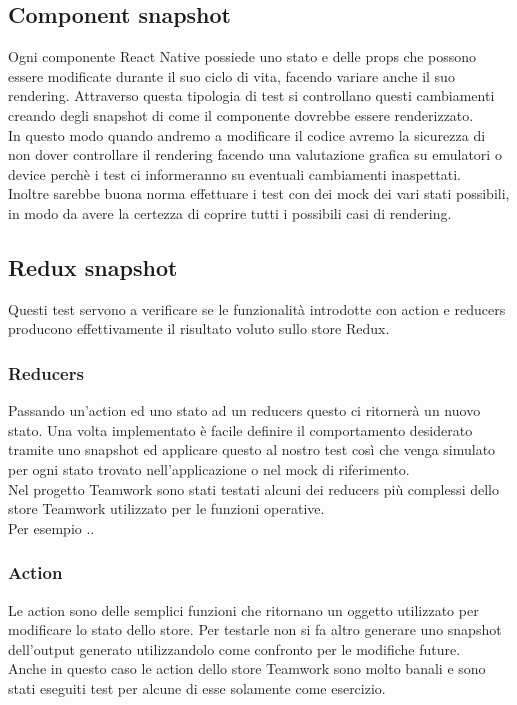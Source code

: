 \subsection{Component snapshot}
Ogni componente React Native possiede uno stato e delle props che possono essere modificate durante il suo ciclo di vita, facendo variare anche il suo rendering. Attraverso questa tipologia di test si controllano questi cambiamenti creando degli snapshot di come il componente dovrebbe essere renderizzato. \\
In questo modo quando andremo a modificare il codice avremo la sicurezza di non dover controllare il rendering facendo una valutazione grafica su emulatori o device perchè i test ci informeranno su eventuali cambiamenti inaspettati. \\
Inoltre sarebbe buona norma effettuare i test con dei mock dei vari stati possibili, in modo da avere la certezza di coprire tutti i possibili casi di rendering.

\subsection{Redux snapshot}
Questi test servono a verificare se le funzionalità introdotte con action e reducers producono effettivamente il risultato voluto sullo store Redux. \\
\subsubsection{Reducers}
Passando un'action ed uno stato ad un reducers questo ci ritornerà un nuovo stato. Una volta implementato è facile definire il comportamento desiderato tramite uno snapshot ed applicare questo al nostro test così che venga simulato per ogni stato trovato nell'applicazione o nel mock di riferimento. \\
Nel progetto Teamwork sono stati testati alcuni dei reducers più complessi dello store Teamwork utilizzato per le funzioni operative.\\
Per esempio ..
\subsubsection{Action}
Le action sono delle semplici funzioni che ritornano un oggetto utilizzato per modificare lo stato dello store. Per testarle non si fa altro generare uno snapshot dell'output generato utilizzandolo come confronto per le modifiche future. \\
Anche in questo caso le action dello store Teamwork sono molto banali e sono stati eseguiti test per alcune di esse solamente come esercizio.

